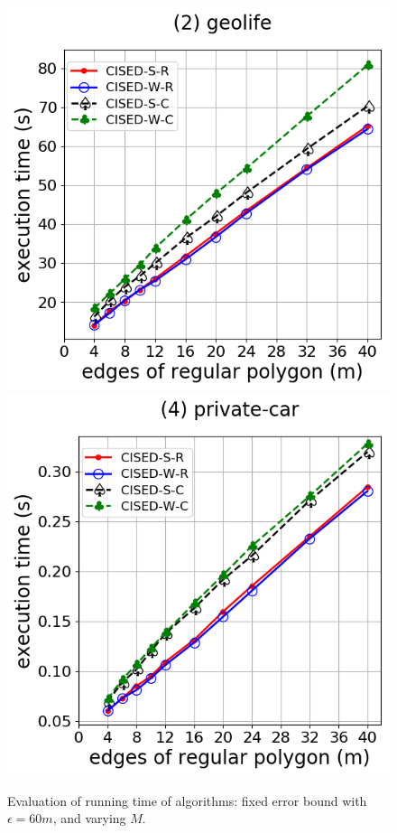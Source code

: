 \begin{figure}[tb!]
\includegraphics[scale = 0.250]{figures/Exp-M-e-60-time-geolife.png}
\includegraphics[scale = 0.250]{figures/Exp-M-e-60-time-private.png}
\vspace{-2ex}
\caption{\small Evaluation of running time of \lsa algorithms: fixed error bound with $\epsilon=60m$, and varying $M$.}
\label{fig:m-time-e20}
\vspace{-1ex}
\end{figure}

